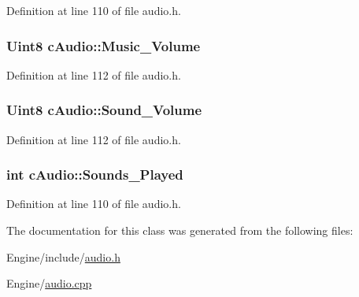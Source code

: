 Definition at line 110 of file audio.\-h.

\hypertarget{classc_audio_aa7d2c11847671823d34a694ad797bb75}{
\subsubsection[{Music\-\_\-\-Volume}]{\setlength{\rightskip}{0pt plus 5cm}Uint8 c\-Audio\-::\-Music\-\_\-\-Volume}}\label{classc_audio_aa7d2c11847671823d34a694ad797bb75}


Definition at line 112 of file audio.\-h.

\hypertarget{classc_audio_a3ac7aee05ebb4a7cdcfb5668226f6349}{
\subsubsection[{Sound\-\_\-\-Volume}]{\setlength{\rightskip}{0pt plus 5cm}Uint8 c\-Audio\-::\-Sound\-\_\-\-Volume}}\label{classc_audio_a3ac7aee05ebb4a7cdcfb5668226f6349}


Definition at line 112 of file audio.\-h.

\hypertarget{classc_audio_a9ec9fc3a055a17a90e5611570058487f}{
\subsubsection[{Sounds\-\_\-\-Played}]{\setlength{\rightskip}{0pt plus 5cm}int c\-Audio\-::\-Sounds\-\_\-\-Played}}\label{classc_audio_a9ec9fc3a055a17a90e5611570058487f}


Definition at line 110 of file audio.\-h.



The documentation for this class was generated from the following files\-:\begin{DoxyCompactItemize}
\item 
Engine/include/\hyperlink{audio_8h}{audio.\-h}\item 
Engine/\hyperlink{audio_8cpp}{audio.\-cpp}\end{DoxyCompactItemize}
